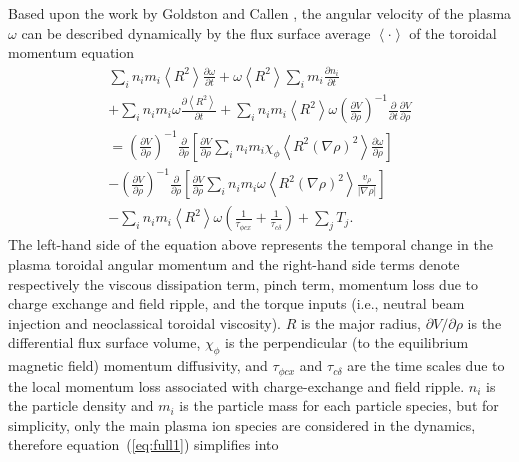 \documentclass[12pt]{iopart}
\begin{document}
Based upon the work by Goldston \cite{Goldston86}  and Callen  \cite{Callen09}, the angular velocity of the plasma $\omega$ can be described dynamically by the flux surface average $\left<\cdot\right>$ of the toroidal momentum equation 
\begin{eqnarray}
  \sum_i n_i m_i \left<R^2\right> \frac{\partial \omega}{\partial t}
  + \omega \left<R^2\right> \sum_i m_i \frac{\partial n_i}{\partial t} \nonumber \\
  + \sum_i n_i m_i \omega \frac{\partial \left<R^2\right>}{\partial t}
  + \sum_i n_i m_i \left<R^2\right> \omega \left( \frac{\partial V}{\partial\rho}\right)^{-1} \frac{\partial}{\partial t} \frac{\partial V}{\partial \rho} \nonumber \\
  = \left( \frac{\partial V}{\partial\rho}\right)^{-1}\frac{\partial}{\partial \rho} \left[\frac{\partial V}{\partial \rho}\sum_i n_i m_i \chi_\phi \left< R^2 (\nabla \rho)^2\right> \frac{\partial\omega}{\partial\rho}\right] \nonumber \\
  - \left( \frac{\partial V}{\partial\rho}\right)^{-1}\frac{\partial}{\partial \rho} \left[\frac{\partial V}{\partial \rho}\sum_i n_i m_i \omega \left< R^2 (\nabla \rho)^2\right> \frac{v_\rho}{|\nabla\rho|}\right] \nonumber \\
  - \sum_i n_i m_i \left< R^2\right> \omega \left( \frac{1}{\tau_{\phi cx}} + \frac{1}{\tau_{c\delta}}\right) + \sum_j T_j.
\label{eq:full1}
\end{eqnarray}
The left-hand side of the equation above represents the temporal change in the plasma toroidal angular momentum and the right-hand side terms denote respectively the viscous dissipation term, pinch term, momentum loss due to charge exchange and field ripple, and the torque inputs (i.e., neutral beam injection and neoclassical toroidal viscosity). $R$ is the major radius, $\partial V/\partial\rho$ is the differential flux surface volume, $\chi_\phi$ is the perpendicular (to the equilibrium magnetic field) momentum diffusivity, and $\tau_{\phi c x}$ and $\tau_{c\delta}$ are the time scales due to the local momentum loss associated with charge-exchange and field ripple. $n_i$ is the particle density and $m_i$ is the particle mass for each particle species, but for simplicity, only the main plasma ion species are considered in the dynamics, therefore equation~(\ref{eq:full1}) simplifies into
\end{document}
